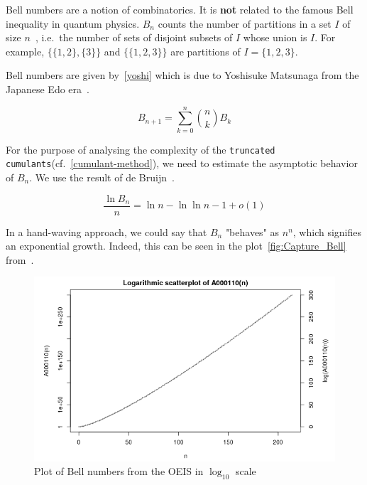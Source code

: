 Bell numbers are a notion of combinatorics. It is \textbf{not} related to the famous Bell inequality in quantum physics. $B_n$ counts the number of partitions in a set $I$ of size $n$~\cite{knuth, OEIS-Bell}, i.e.\@~the number of sets of disjoint subsets of $I$ whose union is $I$. For example, $\{\{1, 2\}, \{3\}\}$ and $\{\{1, 2, 3\}\}$ are partitions of $I = \{1, 2, 3\}$.

Bell numbers are given by~\autoref{yoshi} which is due to Yoshisuke Matsunaga from the Japanese Edo era~\cite{knuth}.

\begin{theorem} \label{yoshi}
    \begin{equation}
        B_{n+1} = \sum_{k=0}^n \binom{n}{k} B_k
    \end{equation}
\end{theorem}

For the purpose of analysing the complexity of the \texttt{truncated cumulants}(cf.\@~\ref{cumulant-method}), we need to estimate the asymptotic behavior of $B_n$. We use the result of de Bruijn~\cite{deBruijn}.


\begin{theorem}[De Bruijn]
    \begin{equation}
        \frac{\ln{B_n}}{n} = \ln{n} - \ln{\ln{n}} - 1 + o(1)
    \end{equation}
\end{theorem}

In a hand-waving approach, we could say that $B_n$ "behaves" as $n^n$, which signifies an exponential growth. Indeed, this can be seen in the plot~\autoref{fig:Capture_Bell} from~\cite{Graph-Bell}.

\begin{center}
    \begin{figure}[h!]
      \centering
      \includegraphics[width=0.6\linewidth]{Pics/Capture_Bell.PNG}
      \caption{Plot of Bell numbers from the OEIS \cite{Graph-Bell} in $\log_{10}$ scale}
      \label{fig:Capture_Bell}
    \end{figure}
\end{center}